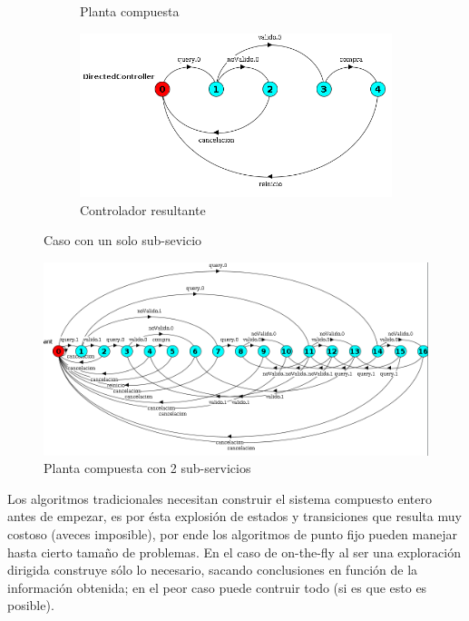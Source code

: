 \begin{figure}[htb]
\begin{center}
{\begin{subfigure}[t]{.5\textwidth}
		\caption{Planta compuesta}
		\label{fig:N1Planta}
	\end{subfigure}
	\begin{subfigure}[t]{.5\textwidth}
	\centering
	\includegraphics[width=\linewidth]{figures/ejemploServicios/N1Controlador.png}  
	\caption{Controlador resultante}
	\label{fig:controladorN1}
	\end{subfigure}
	}
	\caption{Caso con un solo sub-sevicio}
	\label{fig:N1}
	\end{center}
\end{figure}

\begin{figure}[htb]
	\includegraphics[width=\linewidth]{figures/ejemploServicios/N2Planta.png}  
	\caption{Planta compuesta con 2 sub-servicios}
	\label{fig:N2}
\end{figure}


Los algoritmos tradicionales necesitan construir el sistema compuesto entero antes de empezar, es por ésta explosión de estados y transiciones que resulta muy costoso (aveces imposible), por ende los algoritmos de punto fijo pueden manejar hasta cierto tamaño de problemas. En el caso de on-the-fly al ser una exploración dirigida construye sólo lo necesario, sacando conclusiones en función de la información obtenida; en el peor caso puede contruir todo (si es que esto es posible).

